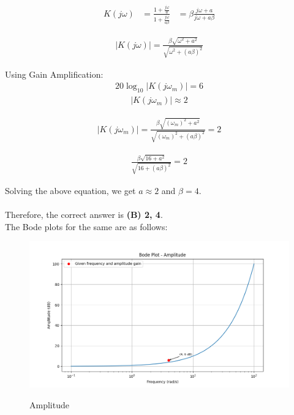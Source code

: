 \documentclass[journal,12pt,twocolumn]{IEEEtran}
\theoremstyle{remark}
\begin{document}
    \begin{align}
    K(j\omega) &= \frac{1 + \frac{j\omega}{a}}{1 + \frac{j\omega}{a\beta}} 
    &= \beta \frac{j\omega + a}{j\omega + a\beta}
    \end{align}
    
    \begin{align}
    |K(j\omega)| =\frac{\beta \sqrt{\omega^2 + a^2}}{\sqrt{\omega^2 + (a\beta)^2}}
    \end{align}
    
    Using Gain Amplification:
    \begin{align}
     20\log_{10}|K(j\omega_m)| = 6
     \end{align}
     \begin{align}
     |K(j\omega_m)| \approx  2
     \end{align}
     
    \begin{align}
    |K(j\omega_m)| =\frac{\beta \sqrt{(\omega_m)^2 + a^2}}{\sqrt{(\omega_m)^2 + (a\beta)^2}}=2
    \end{align}
    
    \begin{align}
    \frac{\beta \sqrt{16 + a^2}}{\sqrt{16 + (a\beta)^2}}=2
    \end{align}
    
    Solving the above equation, we get \(a \approx 2\) and \(\beta = 4\).\\\\ Therefore, the correct answer is \textbf{(B) 2, 4}.\\
    The Bode plots for the same are as follows:
  \begin{figure}[h!]
  \centering
  \caption{Amplitude}
  \includegraphics[width=\columnwidth]{2023/EE/38/figs/amplitude.png}
  \label{fig:ashbodeamplitude}
\end{figure}
\end{document}

